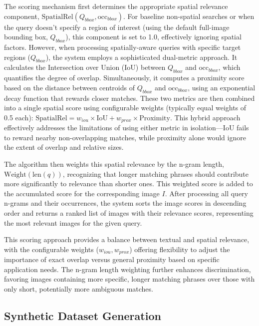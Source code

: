 \documentclass[manuscript,screen]{acmart}
\begin{document}
The scoring mechanism first determines the appropriate spatial relevance component, $\text{SpatialRel}(Q_{bbox}, \text{occ}_{bbox})$. For baseline non-spatial searches or when the query doesn't specify a region of interest (using the default full-image bounding box, $Q_{bbox}$), this component is set to 1.0, effectively ignoring spatial factors. However, when processing spatially-aware queries with specific target regions ($Q_{bbox}$), the system employs a sophisticated dual-metric approach. It calculates the Intersection over Union (IoU) between $Q_{bbox}$ and $\text{occ}_{bbox}$, which quantifies the degree of overlap. Simultaneously, it computes a proximity score based on the distance between centroids of $Q_{bbox}$ and $\text{occ}_{bbox}$, using an exponential decay function that rewards closer matches. These two metrics are then combined into a single spatial score using configurable weights (typically equal weights of 0.5 each): $\text{SpatialRel} = w_{iou} \times \text{IoU} + w_{prox} \times \text{Proximity}$. This hybrid approach effectively addresses the limitations of using either metric in isolation—IoU fails to reward nearby non-overlapping matches, while proximity alone would ignore the extent of overlap and relative sizes.

The algorithm then weights this spatial relevance by the n-gram length, $\text{Weight}(\text{len}(q))$, recognizing that longer matching phrases should contribute more significantly to relevance than shorter ones. This weighted score is added to the accumulated score for the corresponding image $I$. After processing all query n-grams and their occurrences, the system sorts the image scores in descending order and returns a ranked list of images with their relevance scores, representing the most relevant images for the given query.

This scoring approach provides a balance between textual and spatial relevance, with the configurable weights ($w_{iou}, w_{prox}$) offering flexibility to adjust the importance of exact overlap versus general proximity based on specific application needs. The n-gram length weighting further enhances discrimination, favoring images containing more specific, longer matching phrases over those with only short, potentially more ambiguous matches.

\subsection{Synthetic Dataset Generation}
\label{sec:synthetic_data}
\end{document}
